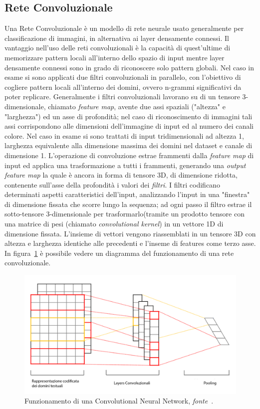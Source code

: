 \subsection{Rete Convoluzionale}
Una Rete Convoluzionale è un modello di rete neurale usato generalmente per classificazione di immagini, in alternativa ai layer densamente connessi. Il vantaggio nell'uso delle reti convoluzionali è la capacità di quest'ultime di memorizzare pattern locali all'interno dello spazio di input mentre layer densamente connessi sono in grado di riconoscere solo pattern globali. Nel caso in esame si sono applicati due filtri convoluzionali in parallelo, con l'obiettivo di cogliere pattern locali all'interno dei domini, ovvero n-grammi significativi da poter replicare. Generalmente i filtri convoluzionali lavorano su di un tensore 3-dimensionale, chiamato \textit{feature map}, avente due assi spaziali ("altezza" e "larghezza") ed un asse di profondità; nel caso di riconoscimento di immagini tali assi corrispondono alle dimensioni dell'immagine di input ed al numero dei canali colore. Nel caso in esame si sono trattati di input tridimensionali ad altezza 1, larghezza equivalente alla dimensione massima dei domini nel dataset e canale di dimensione 1. L'operazione di convoluzione estrae frammenti dalla \textit{feature map} di input ed applica una trasformazione a tutti i frammenti, generando una \textit{output feature map} la quale è ancora in forma di tensore 3D, di dimensione ridotta, contenente sull'asse della profondità i valori dei \textit{filtri}. I filtri codificano determinati aspetti caratteristici dell'input, analizzando l'input in una "finestra" di dimensione fissata che scorre lungo la sequenza; ad ogni passo il filtro estrae il sotto-tensore 3-dimensionale per trasformarlo(tramite un prodotto tensore con una matrice di pesi (chiamato \textit{convolutional kernel}) in un vettore 1D di dimensione fissata. L'insieme di vettori vengono riassemblati in un tensore 3D con altezza e larghezza identiche alle precedenti e l'inseme di features come terzo asse. In figura~\ref{fig:cnn} è possibile vedere un diagramma del funzionamento di una rete convoluzionale.

\begin{figure}[!htbp]
    \centering
	\includegraphics[width=\columnwidth]{figures/CNN.png}
	\caption{Funzionamento di una Convolutional Neural Network,\textit{ fonte}~\cite{fig:cnnfonte}.
\label{fig:cnn}}
\end{figure}


